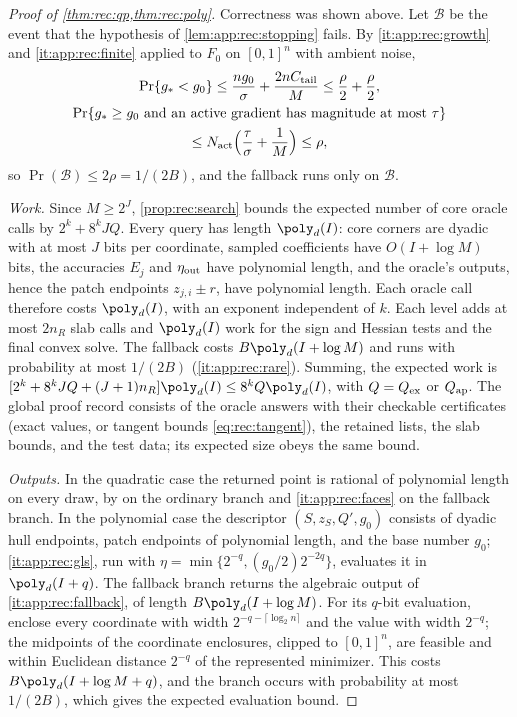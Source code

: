 \begin{proof}[Proof of \cref{thm:rec:qp,thm:rec:poly}]
Correctness was shown above. Let $\mathcal B$ be the event that the
hypothesis of \cref{lem:app:rec:stopping} fails. By \ref{it:app:rec:growth}
and \ref{it:app:rec:finite} applied to $F_0$ on $[0,1]^n$ with ambient
noise,
\begin{gather*}
 \Pr\{g_*<g_0\}\le\frac{ng_0}\sigma+\frac{2nC_{\rm tail}}M\le\frac\rho2+\frac\rho2,\\
 \Pr\{g_*\ge g_0\ \text{and an active gradient has magnitude at most }\tau\}\\
 \le N_{\rm act}\Bigl(\frac\tau\sigma+\frac1M\Bigr)\le\rho,
\end{gather*}
so $\Pr(\mathcal B)\le2\rho=1/(2B)$, and the fallback runs only on
$\mathcal B$.

\emph{Work.} Since $M\ge2^J$, \cref{prop:rec:search} bounds the expected
number of core oracle calls by $2^k+8^kJQ$. Every query has length
$\poly_d(I)$: core corners are dyadic with at most $J$ bits per coordinate,
sampled coefficients have $O(I+\log M)$ bits, the accuracies $E_j$ and
$\eta_{\rm out}$ have polynomial length, and the oracle's outputs, hence the
patch endpoints $z_{j,i}\pm r$, have polynomial length. Each oracle call
therefore costs $\poly_d(I)$, with an exponent independent of $k$. Each level
adds at most $2n_R$ slab calls and $\poly_d(I)$ work for the sign and Hessian
tests and the final convex solve. The fallback costs $B\poly_d(I+\log M)$ and
runs with probability at most $1/(2B)$ (\ref{it:app:rec:rare}). Summing,
the expected work is $[2^k+8^kJQ+(J+1)n_R]\poly_d(I)\le8^kQ\poly_d(I)$, with
$Q=Q_{\rm ex}$ or $Q_{\rm ap}$. The global proof record consists of the oracle
answers with their checkable certificates (exact values, or tangent bounds
\eqref{eq:rec:tangent}), the retained lists, the slab bounds, and the test
data; its expected size obeys the same bound.

\emph{Outputs.} In the quadratic case the returned point is rational of
polynomial length on every draw, by \citet{kozlov1980-the-polynomial-solvability-of-convex} on the
ordinary branch and \ref{it:app:rec:faces} on the fallback branch. In the
polynomial case the descriptor $(S,z_S,Q',g_0)$ consists of dyadic hull
endpoints, patch endpoints of polynomial length, and the base number $g_0$;
\ref{it:app:rec:gls}, run with
$\eta=\min\{2^{-q},(g_0/2)2^{-2q}\}$, evaluates it in $\poly_d(I+q)$.
The fallback branch returns the algebraic output of
\ref{it:app:rec:fallback}, of length $B\poly_d(I+\log M)$. For its $q$-bit
evaluation, enclose every coordinate with width $2^{-q-\lceil\log_2n\rceil}$
and the value with width $2^{-q}$; the midpoints of the coordinate
enclosures, clipped to $[0,1]^n$, are feasible and within Euclidean distance
$2^{-q}$ of the represented minimizer. This costs $B\poly_d(I+\log M+q)$, and the branch occurs with
probability at most $1/(2B)$, which gives the expected evaluation bound.
\end{proof}

